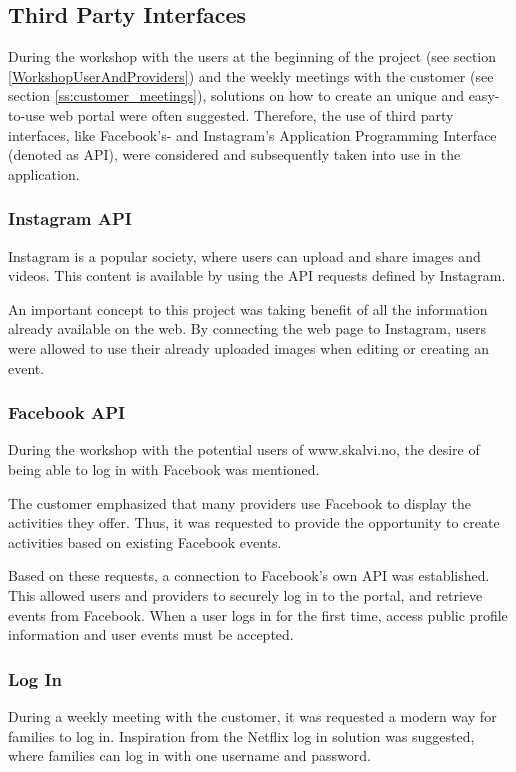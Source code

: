 \subsection{Third Party Interfaces}
During the workshop with the users at the beginning of the project (see section \ref{WorkshopUserAndProviders}) and the weekly meetings with the customer (see section \ref{ss:customer_meetings}), solutions on how to create an unique and easy-to-use web portal were often suggested. Therefore, the use of third party interfaces, like Facebook's- and Instagram's Application Programming Interface (denoted as API), were considered and subsequently taken into use in the application. 

\subsubsection{Instagram API}
Instagram is a popular society, where users can upload and share images and videos. This content is available by using the API requests defined by Instagram.

An important concept to this project was taking benefit of all the information already available on the web. By connecting the web page to Instagram, users were allowed to use their already uploaded images when editing or creating an event.

\subsubsection{Facebook API}
During the workshop with the potential users of www.skalvi.no, the desire of being able to log in with Facebook was mentioned.

The customer emphasized that many providers use Facebook to display the activities they offer. Thus, it was requested to provide the opportunity to create activities based on existing Facebook events.  

Based on these requests, a connection to Facebook's own API was established. This allowed users and providers to securely log in to the portal, and retrieve events from Facebook. When a user logs in for the first time, access public profile information and user events must be accepted. 

\subsubsection{Log In}
During a weekly meeting with the customer, it was requested a modern way for families to log in. Inspiration from the Netflix log in solution was suggested, where families can log in with one username and password.

